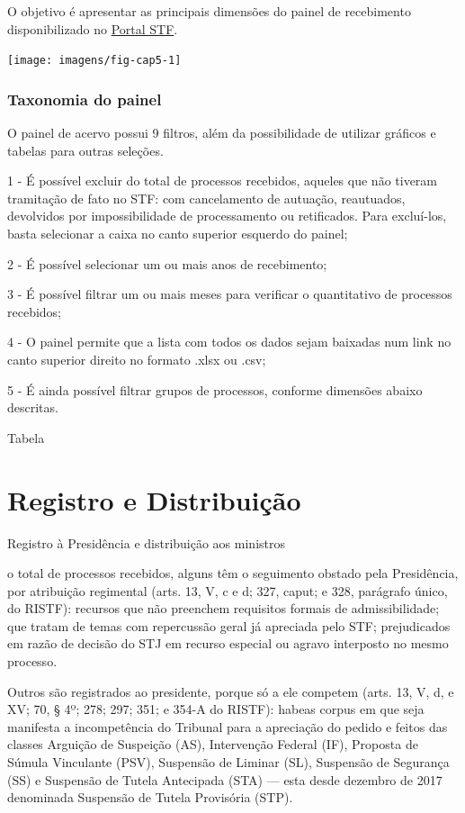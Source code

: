 \documentclass[
]{book}
\begin{document}
O objetivo é apresentar as principais dimensões do painel de recebimento disponibilizado no \href{https://transparencia.stf.jus.br/single/?appid=b282ea92-29ef-4eeb-9676-2b9615ddfabd\&sheet=ef87c134-e282-47ac-8f8f-813754f74e76}{Portal STF}.

\texttt{[image: imagens/fig-cap5-1]}

\hypertarget{taxonomia-do-painel}{%
\subsection{Taxonomia do painel}\label{taxonomia-do-painel}}

O painel de acervo possui 9 filtros, além da possibilidade de utilizar gráficos e tabelas para outras seleções.

1 - É possível excluir do total de processos recebidos, aqueles que não tiveram tramitação de fato no STF: com cancelamento de autuação, reautuados, devolvidos por impossibilidade de processamento ou retificados. Para excluí-los, basta selecionar a caixa no canto superior esquerdo do painel;

2 - É possível selecionar um ou mais anos de recebimento;

3 - É possível filtrar um ou mais meses para verificar o quantitativo de processos recebidos;

4 - O painel permite que a lista com todos os dados sejam baixadas num link no canto superior direito no formato .xlsx ou .csv;

5 - É ainda possível filtrar grupos de processos, conforme dimensões abaixo descritas.

Tabela

\hypertarget{registro-distribuicao}{%
\chapter{Registro e Distribuição}\label{registro-distribuicao}}

Registro à Presidência e distribuição aos ministros

o total de processos recebidos, alguns têm o seguimento obstado pela Presidência, por atribuição regimental (arts. 13, V, c e d; 327, caput; e 328, parágrafo único, do RISTF): recursos que não preenchem requisitos formais de admissibilidade; que tratam de temas com repercussão geral já apreciada pelo STF; prejudicados em razão de decisão do STJ em recurso especial ou agravo interposto no mesmo processo.

Outros são registrados ao presidente, porque só a ele competem (arts. 13, V, d, e XV; 70, § 4º; 278; 297; 351; e 354-A do RISTF): habeas corpus em que seja manifesta a incompetência do Tribunal para a apreciação do pedido e feitos das classes Arguição de Suspeição (AS), Intervenção Federal (IF), Proposta de Súmula Vinculante (PSV), Suspensão de Liminar (SL), Suspensão de Segurança (SS) e Suspensão de Tutela Antecipada (STA) --- esta desde dezembro de 2017 denominada Suspensão de Tutela Provisória (STP).
\end{document}
